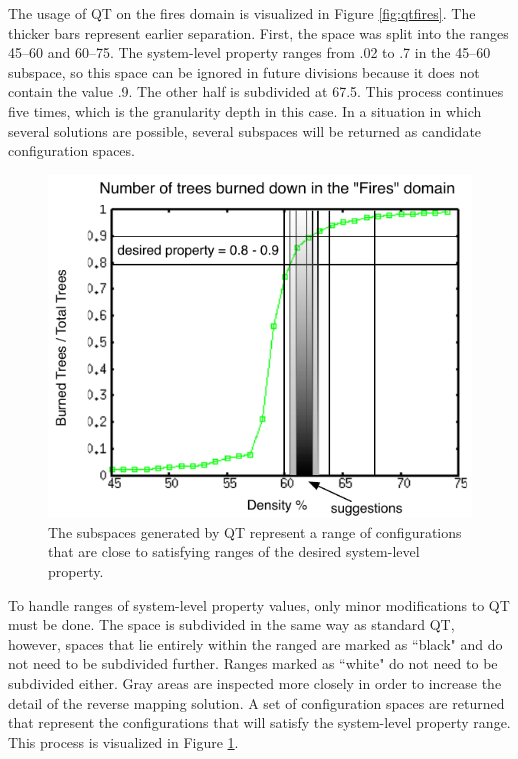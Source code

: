 The usage of QT on the fires domain is visualized in Figure \ref{fig:qtfires}.
The thicker bars represent earlier separation.
First, the space was split into the ranges 45--60 and 60--75.
The system-level property ranges from .02 to .7 in the 45--60 subspace, so this space can be ignored in future divisions because it does not contain the value .9.
The other half is subdivided at 67.5.
This process continues five times, which is the granularity depth in this case.
In a situation in which several solutions are possible, several subspaces will be returned as candidate configuration spaces.


\begin{figure}[ht]
\centering
\includegraphics[scale=1]{images/QTfiresranges.pdf}
\caption{The subspaces generated by QT represent a range of configurations that are close to satisfying ranges of the desired system-level property.}
\label{fig:qtfiresranges}
\end{figure}
To handle ranges of system-level property values, only minor modifications to QT must be done.
The space is subdivided in the same way as standard QT, however, spaces that lie entirely within the ranged are marked as ``black" and do not need to be subdivided further.
Ranges marked as ``white" do not need to be subdivided either.
Gray areas are inspected more closely in order to increase the detail of the reverse mapping solution.
A set of configuration spaces are returned that represent the configurations that will satisfy the system-level property range.
This process is visualized in Figure \ref{fig:qtfiresranges}.



